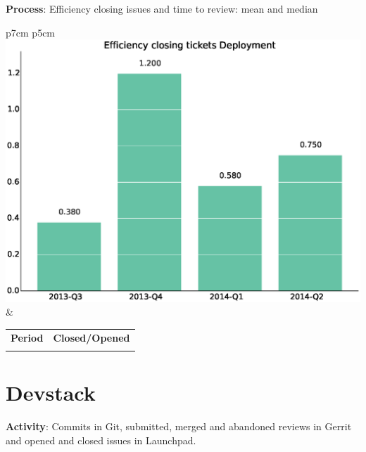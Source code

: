 \documentclass[a4wide,11pt]{report}
\begin{document}
\textbf{Process}: Efficiency closing issues and time to review: mean and median

\begin{tabular}{p{7cm} p{5cm}}
    \vspace{0pt} 
    \includegraphics[scale=.35]{figs/bmiDeployment.eps}
    & 
    \vspace{0pt}
    \begin{tabular}{l|l}%
    \bfseries Period & \bfseries Closed/Opened %
    \csvreader[head to column names]{data/bmiDeployment.csv}{}%
    {\\ & \bmi}
    \end{tabular}
\end{tabular}


\newpage
\section{Devstack}

\textbf{Activity}: Commits in Git, submitted, merged and abandoned reviews in Gerrit and opened and closed issues in Launchpad.
\end{document}
